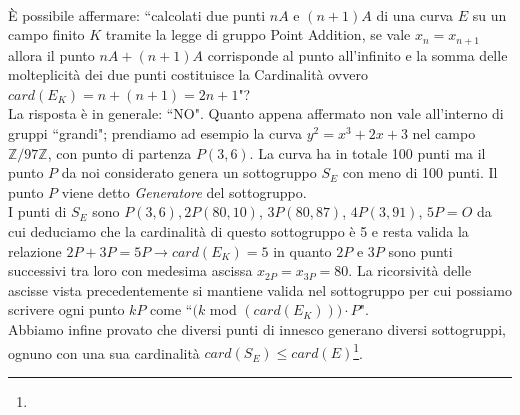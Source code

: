 \documentclass[a4paper,12pt]{tesiinfo}
\renewcommand{\footnotesize}{\fontsize{9pt}{11pt}\selectfont}
\begin{document}
\begin{enumerate}
 \\
 \`E possibile affermare: ``calcolati due punti $nA$ e $(n+1)A$ di una curva $E$ su un campo finito $K$ tramite la legge di gruppo Point Addition, se vale $x_n = x_{n+1}$ allora il punto $nA + (n+1)A$ corrisponde al punto all'infinito e la somma delle molteplicit\`a dei due punti costituisce la Cardinalit\`a ovvero $card(E_K) = n+(n+1) = 2n+1$"?
 \\
 La risposta \`e in generale: ``NO". Quanto appena affermato non vale all'interno di gruppi ``grandi"; prendiamo ad esempio la curva $y^2 = x^3 + 2x+3$ nel campo $\mathbb{Z}/97\mathbb{Z}$, con punto di partenza $P(3, 6)$. La curva ha in totale 100 punti ma il punto $P$ da noi considerato genera un sottogruppo $S_E$ con meno di 100 punti. Il punto $P$ viene detto \textit{Generatore} del sottogruppo. 
 \\
 I punti di $S_E$ sono $P(3, 6), 2P(80, 10)$, $3P(80, 87)$, $4P(3, 91)$, $5P = O$ da cui deduciamo che la cardinalit\`a di questo sottogruppo \`e 5 e resta valida la relazione $2P+3P = 5P \to card(E_K) = 5$ in quanto $2P$ e $3P$ sono punti successivi tra loro con medesima ascissa $x_{2P} = x_{3P} = 80$. La ricorsivit\`a delle ascisse vista precedentemente si mantiene valida nel sottogruppo per cui possiamo scrivere ogni punto $kP$ come ``$(k$ mod $(card(E_K))) \cdot P$".\\
 Abbiamo infine provato che diversi punti di innesco generano diversi sottogruppi, ognuno con una sua cardinalit\`a $card(S_E) \le card(E)$\footnote{\footnotesize{Viene rispettata l'uguaglianza tra i due termini quando non esistono sottogruppi, esattamente come accadeva nel primo esempio}}.
 

\end{enumerate}
\end{document}

